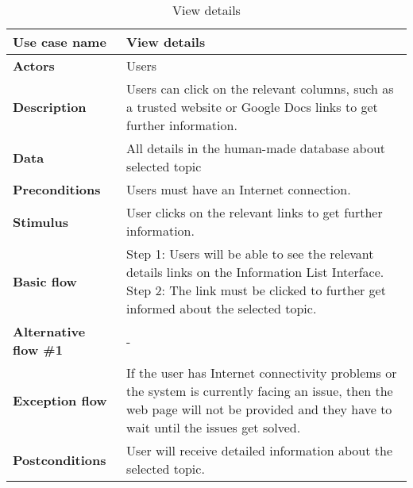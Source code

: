 \documentclass[listof=nochaptergap]{report}
\begin{document}
        \begin{table}[H]
        \centering
         \begin{tabular}{| p{4cm} | p{10cm} |} 
         \hline
         \textbf{Use case name} & View details \\
         \hline
         \textbf{Actors} & Users \\
         \hline
         \textbf{Description} & Users can click on the relevant columns, such as a trusted website or Google Docs links to get further information. \\
         \hline
         \textbf{Data} & All details in the human-made database about selected topic \\
         \hline
         \textbf{Preconditions} & Users must have an Internet connection. \\
         \hline
         \textbf{Stimulus} & User clicks on the relevant links to get further information. \\
         \hline
         \textbf{Basic flow} & Step 1: Users will be able to see the relevant details links on the Information List Interface.
         \newline Step 2: The link must be clicked to further get informed about the selected topic. \\
         \hline
         \textbf{Alternative flow \#1} & - \\
         \hline
         \textbf{Exception flow} & If the user has Internet connectivity problems or the system is currently facing an issue, then the web page will not be provided and they have to wait until the issues get solved. \\
         \hline
         \textbf{Postconditions} & User will receive detailed information about the selected topic. \\
         \hline
         \end{tabular}
        \caption{View details}
        \label{tab:table15}
    \end{table}
\end{document}
